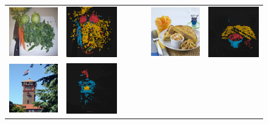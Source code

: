 \begin{figure}[t]
\centering
  \setlength{\tabcolsep}{0.5pt}
\begin{tabular}{cc ccc cc}
	\includegraphics[width=.24\linewidth]{1935.png}&
	\includegraphics[width=.24\linewidth]{bnw-1935.png}&&&&
	\includegraphics[width=.24\linewidth]{2642.png}&
	\includegraphics[width=.24\linewidth]{bnw-2642.png}
\\
	\includegraphics[width=.24\linewidth]{3017.png}&
	\includegraphics[width=.24\linewidth]{bnw-3017.png}&&&&

\end{tabular}
\end{figure}
